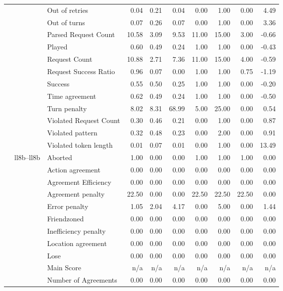 \begin{tabular}{lllrrrrrrr}
 &  & Out of retries & 0.04 & 0.21 & 0.04 & 0.00 & 1.00 & 0.00 & 4.49 \\
 &  & Out of turns & 0.07 & 0.26 & 0.07 & 0.00 & 1.00 & 0.00 & 3.36 \\
 &  & Parsed Request Count & 10.58 & 3.09 & 9.53 & 11.00 & 15.00 & 3.00 & -0.66 \\
 &  & Played & 0.60 & 0.49 & 0.24 & 1.00 & 1.00 & 0.00 & -0.43 \\
 &  & Request Count & 10.88 & 2.71 & 7.36 & 11.00 & 15.00 & 4.00 & -0.59 \\
 &  & Request Success Ratio & 0.96 & 0.07 & 0.00 & 1.00 & 1.00 & 0.75 & -1.19 \\
 &  & Success & 0.55 & 0.50 & 0.25 & 1.00 & 1.00 & 0.00 & -0.20 \\
 &  & Time agreement & 0.62 & 0.49 & 0.24 & 1.00 & 1.00 & 0.00 & -0.50 \\
 &  & Turn penalty & 8.02 & 8.31 & 68.99 & 5.00 & 25.00 & 0.00 & 0.54 \\
 &  & Violated Request Count & 0.30 & 0.46 & 0.21 & 0.00 & 1.00 & 0.00 & 0.87 \\
 &  & Violated pattern & 0.32 & 0.48 & 0.23 & 0.00 & 2.00 & 0.00 & 0.91 \\
 &  & Violated token length & 0.01 & 0.07 & 0.01 & 0.00 & 1.00 & 0.00 & 13.49 \\
\cline{2-10}
 & \multirow[t]{27}{*}{ll8b--ll8b} & Aborted & 1.00 & 0.00 & 0.00 & 1.00 & 1.00 & 1.00 & 0.00 \\
 &  & Action agreement & 0.00 & 0.00 & 0.00 & 0.00 & 0.00 & 0.00 & 0.00 \\
 &  & Agreement Efficiency & 0.00 & 0.00 & 0.00 & 0.00 & 0.00 & 0.00 & 0.00 \\
 &  & Agreement penalty & 22.50 & 0.00 & 0.00 & 22.50 & 22.50 & 22.50 & 0.00 \\
 &  & Error penalty & 1.05 & 2.04 & 4.17 & 0.00 & 5.00 & 0.00 & 1.44 \\
 &  & Friendzoned & 0.00 & 0.00 & 0.00 & 0.00 & 0.00 & 0.00 & 0.00 \\
 &  & Inefficiency penalty & 0.00 & 0.00 & 0.00 & 0.00 & 0.00 & 0.00 & 0.00 \\
 &  & Location agreement & 0.00 & 0.00 & 0.00 & 0.00 & 0.00 & 0.00 & 0.00 \\
 &  & Lose & 0.00 & 0.00 & 0.00 & 0.00 & 0.00 & 0.00 & 0.00 \\
 &  & Main Score & n/a & n/a & n/a & n/a & n/a & n/a & n/a \\
 &  & Number of Agreements & 0.00 & 0.00 & 0.00 & 0.00 & 0.00 & 0.00 & 0.00 \\

\end{tabular}
